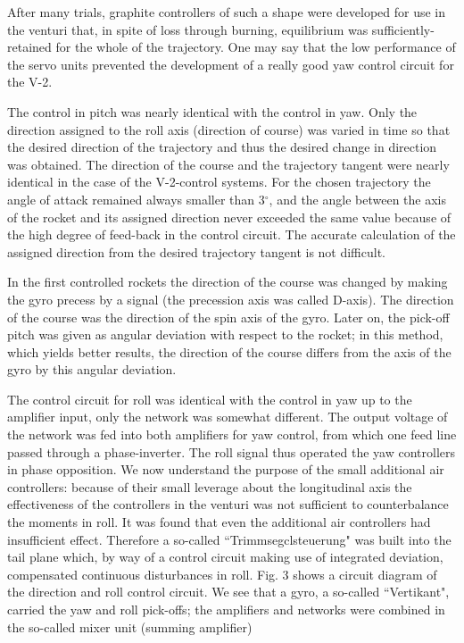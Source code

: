 \documentclass[12pt, a4paper]{article}
\begin{document}
After many trials, graphite controllers of such a shape were developed for use in the venturi that, in spite of loss through burning, equilibrium was sufficiently- retained for the whole of the trajectory. One may say that the low performance of the servo units prevented the development of a really good yaw control circuit for the V-2.

The control in pitch was nearly identical with the control in yaw. Only the direction assigned to the roll axis (direction of course) was varied in time so that the desired direction of the trajectory and thus the desired change in direction was obtained. The direction of the course and the trajectory tangent were nearly identical in the case of the V-2-control systems. For the chosen trajectory the angle of attack remained always smaller than 3$^\circ$, and the angle between the axis of the rocket and its assigned direction never exceeded the same value because of the high degree of feed-back in the control circuit. The accurate calculation of the assigned direction from the desired trajectory tangent is not difficult.

In the first controlled rockets the direction of the course was changed by making the gyro precess by a signal (the precession axis was called D-axis). The direction of the course was the direction of the spin axis of the gyro. Later on, the pick-off pitch was given as angular deviation with respect to the rocket; in this method, which yields better results, the direction of the course differs from the axis of the gyro by this angular deviation.

The control circuit for roll was identical with the control in yaw up to the amplifier input, only the network was somewhat different. The output voltage of the network was fed into both amplifiers for yaw control, from which one feed line passed through a phase-inverter. The roll signal thus operated the yaw controllers in phase opposition. We now understand the purpose of the small additional air controllers: because of their small leverage about the longitudinal axis the effectiveness of the controllers in the venturi was not sufficient to counterbalance the moments in roll. It was found that even the additional air controllers had insufficient effect. Therefore a so-called ``Trimmsegclsteuerung" was built into the tail plane which, by way of a control circuit making use of integrated deviation, compensated continuous disturbances in roll. Fig. 3 shows a circuit diagram of the direction and roll control circuit. We see that a gyro, a so-called ``Vertikant", carried the yaw and roll pick-offs; the amplifiers and networks were combined in the so-called mixer unit (summing amplifier)
\end{document}

